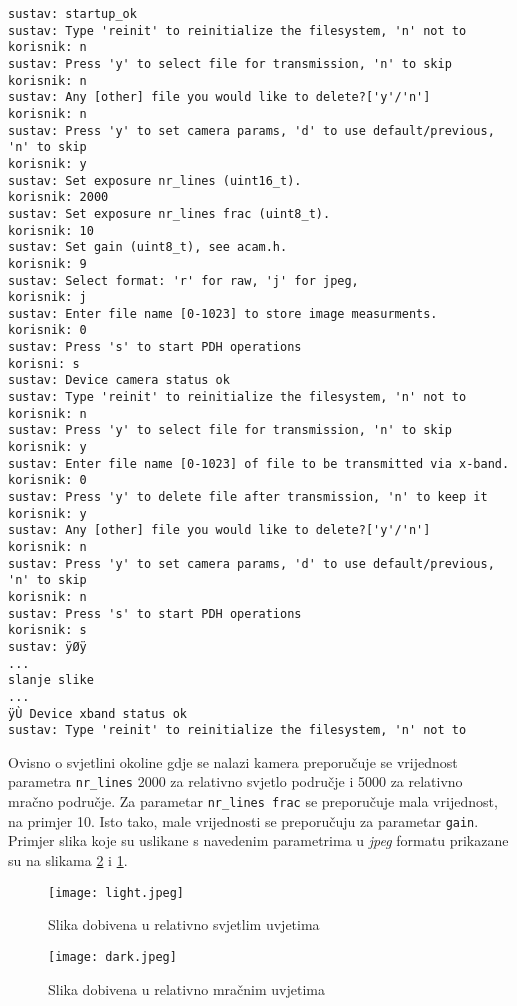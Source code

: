 \begin{lstlisting}[caption=Komunikacija između računala i PDH sustava, label={lst:default_comms}]
sustav: startup_ok
sustav: Type 'reinit' to reinitialize the filesystem, 'n' not to
korisnik: n
sustav: Press 'y' to select file for transmission, 'n' to skip
korisnik: n
sustav: Any [other] file you would like to delete?['y'/'n']
korisnik: n
sustav: Press 'y' to set camera params, 'd' to use default/previous, 'n' to skip
korisnik: y
sustav: Set exposure nr_lines (uint16_t).
korisnik: 2000
sustav: Set exposure nr_lines frac (uint8_t).
korisnik: 10
sustav: Set gain (uint8_t), see acam.h.
korisnik: 9
sustav: Select format: 'r' for raw, 'j' for jpeg,
korisnik: j
sustav: Enter file name [0-1023] to store image measurments.
korisnik: 0
sustav: Press 's' to start PDH operations
korisni: s
sustav: Device camera status ok
sustav: Type 'reinit' to reinitialize the filesystem, 'n' not to
korisnik: n
sustav: Press 'y' to select file for transmission, 'n' to skip
korisnik: y
sustav: Enter file name [0-1023] of file to be transmitted via x-band.
korisnik: 0
sustav: Press 'y' to delete file after transmission, 'n' to keep it
korisnik: y
sustav: Any [other] file you would like to delete?['y'/'n']
korisnik: n
sustav: Press 'y' to set camera params, 'd' to use default/previous, 'n' to skip
korisnik: n
sustav: Press 's' to start PDH operations
korisnik: s
sustav: ÿØÿ
...
slanje slike
...
ÿÙ Device xband status ok
sustav: Type 'reinit' to reinitialize the filesystem, 'n' not to
\end{lstlisting}

Ovisno o svjetlini okoline gdje se nalazi kamera preporučuje se vrijednost parametra \verb|nr_lines| 2000 za relativno svjetlo područje i 5000 za relativno mračno područje. Za parametar \verb|nr_lines frac| se preporučuje mala vrijednost, na primjer 10. Isto tako, male vrijednosti se preporučuju za parametar \verb|gain|. Primjer slika koje su uslikane s navedenim parametrima u \textit{jpeg} formatu prikazane su na slikama \ref{fig:dark} i \ref{fig:light}.
\begin{figure}[H]
	\centering
	\texttt{[image: light.jpeg]}
	\caption{Slika dobivena u relativno svjetlim uvjetima}
	\label{fig:light}
\end{figure}
\begin{figure}[H]
	\centering
	\texttt{[image: dark.jpeg]}
	\caption{Slika dobivena u relativno mračnim uvjetima}
	\label{fig:dark}
\end{figure}